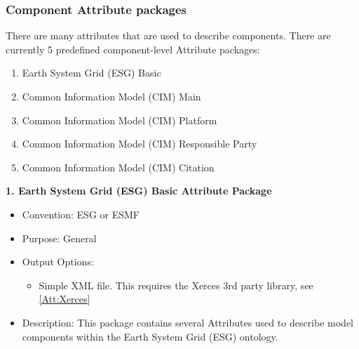 \subsubsection{Component Attribute packages}
\label{ComponentAttributePackages}

There are many attributes that are used to describe components. There are currently 5 predefined component-level Attribute packages:

\begin{enumerate}
    \item Earth System Grid (ESG) Basic
    \item Common Information Model (CIM) Main
    \item Common Information Model (CIM) Platform
    \item Common Information Model (CIM) Responsible Party
    \item Common Information Model (CIM) Citation
\end{enumerate}

\vspace{.20in}

{\bf 1. Earth System Grid (ESG) Basic Attribute Package}

\begin{itemize}
    \item Convention: ESG or ESMF
    \item Purpose: General
    \item Output Options:
    \begin{itemize}
        \item{Simple XML file. This requires the Xerces 3rd party library, see \ref{Att:Xerces}}
    \end{itemize} 
    \item Description: This package contains several Attributes used to describe model components within the Earth System Grid (ESG) ontology. 
\end{itemize}


